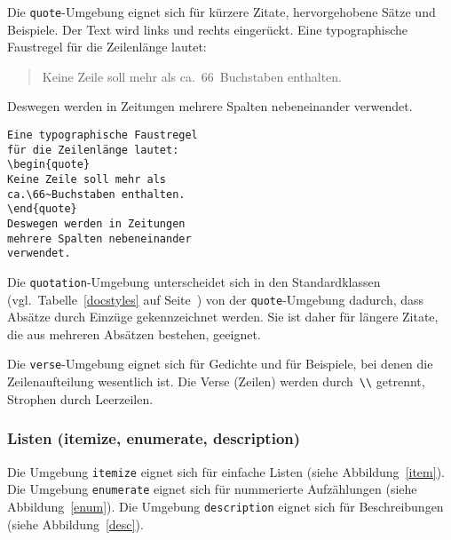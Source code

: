 Die \texttt{quote}-Umgebung eignet sich für kürzere Zitate,
hervorgehobene Sätze und Beispiele.
Der Text wird links und rechts eingerückt.
\exa
Eine typographische Faustregel
für die Zeilenlänge lautet:
\begin{quote}

Keine Zeile soll mehr als
ca.\ 66~Buchstaben enthalten.
\end{quote}
Deswegen werden in Zeitungen
mehrere Spalten nebeneinander
verwendet.
\exb 
\begin{verbatim}
Eine typographische Faustregel
für die Zeilenlänge lautet:
\begin{quote}
Keine Zeile soll mehr als
ca.\66~Buchstaben enthalten.
\end{quote}
Deswegen werden in Zeitungen
mehrere Spalten nebeneinander
verwendet.
\end{verbatim}
\exc

Die \texttt{quotation}-Umgebung unterscheidet sich in den
Standardklassen (vgl.\ Tabelle~\ref{docstyles} auf
Seite~\pageref{docstyles}) von der \texttt{quote}-Umgebung
dadurch, dass Absätze durch Einzüge gekennzeichnet werden.
Sie ist daher für längere Zitate, die aus mehreren Absätzen
bestehen, geeignet.

Die \texttt{verse}-Umgebung eignet sich für Gedichte und für
Beispiele, bei denen die Zeilenaufteilung wesentlich ist.  Die
Verse (Zeilen) werden durch~\verb|\\| getrennt, Strophen durch
Leerzeilen.


\subsubsection{Listen (itemize, enumerate, description)}
 
Die Umgebung \texttt{itemize} eignet sich für einfache Listen
(siehe Abbildung~\ref{item}).
Die Umgebung \texttt{enumerate} eignet sich für nummerierte
Aufzählungen (siehe Abbildung~\ref{enum}).
Die Umgebung \texttt{description} eignet sich für Beschreibungen
(siehe Abbildung~\ref{desc}).

